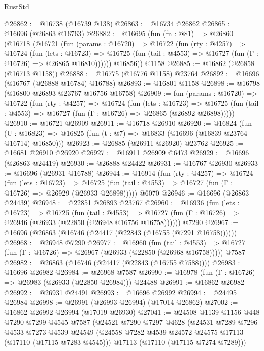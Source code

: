 \begin{lexlean}{RustStd}
\begin{coremodule}
@26862 := @16738 (@16739 @138)
@26863 := @16734 @26862
@26865 := @16696 (@26863 @16763)
@26882 := @16695
    (fun (fn : @81) =>
    @26860
      (@16718
        (@16721
          (fun (params : @16720) =>
          @16722
            (fun (rty : @4257) =>
            @16724
              (fun (lets : @16723) =>
              @16725 (fun (tail : @4553) => @16727 (fun (Γ : @16726) => @26865 @16810))))))
        @16856))
    @1158
@26885 := @16862 (@26858 (@16713 @1158))
@26888 := @16775 (@16776 @1158) @23764
@26892 := @16696 (@16767 (@26888 @16784) @16788)
@26893 := @16801 @1158
@26898 := @16798 (@16800 @26893 @23767 @16756 @16758)
@26909 := fun (params : @16720) =>
  @16722
    (fun (rty : @4257) =>
    @16724
      (fun (lets : @16723) =>
      @16725 (fun (tail : @4553) => @16727 (fun (Γ : @16726) => @26865 (@26892 @26898)))))
@26910 := @16721 @26909
@26911 := @16718 @26910
@26920 := @16824
    (fun (U : @16823) => @16825 (fun (t : @7) => @16833 (@16696 (@16839 @23764 @16714) @16850)))
@26923 := @26885 (@26911 @26920) @23762
@26925 := @16681 @26910 @26920
@26927 := @16911 @26909 @6473
@26929 := @16696 (@26863 @24419)
@26930 := @26888 @24422
@26931 := @16767 @26930
@26933 := @16696 (@26931 @16788)
@26944 := @16914
    (fun (rty : @4257) =>
    @16724
      (fun (lets : @16723) =>
      @16725 (fun (tail : @4553) => @16727 (fun (Γ : @16726) => @26929 (@26933 @26898)))))
    @6070
@26946 := @16696 (@26863 @24439)
@26948 := @22851 @26893 @23767
@26960 := @16936
    (fun (lets : @16723) =>
    @16725
      (fun (tail : @4553) =>
      @16727 (fun (Γ : @16726) => @26946 (@26933 (@22850 (@26948 @16756 @16758))))))
    @7290
@26967 := @16696 (@26863 (@16746 (@24417 (@22843 (@16755 (@7291 @16758))))))
@26968 := @26948 @7290
@26977 := @16960
    (fun (tail : @4553) => @16727 (fun (Γ : @16726) => @26967 (@26933 (@22850 (@26968 @16758)))))
    @7587
@26982 := @26863 (@16746 (@24417 (@22843 (@16755 @7588))))
@26983 := @16696 @26982
@26984 := @26968 @7587
@26990 := @16978 (fun (Γ : @16726) => @26983 (@26933 (@22850 @26984))) @24488
@26991 := @16862 @26982
@26992 := @26931 @24491
@26993 := @16696 @26992
@26994 := @24495 @26984
@26998 := @26991 (@26993 @26994) (@17014 @26862)
@27002 := @16862 @26992 @26994 (@17019 @26930)
@27041 := @24508
    @1139
    @1156
    @448
    @7290
    @7299
    @4545
    @7587
    (@24521
      @7290
      @7297
      @4628
      (@24531
        @7289
        @7296
        @4533
        @7273
        @4539
        @24549
        (@24558 @7282 @4539 @24572 @24575 @17113 (@17110 (@17115 @7283 @4545)))
        @17113
        (@17110 (@17115 @7274 @7289)))

\end{coremodule}
\end{lexlean}
